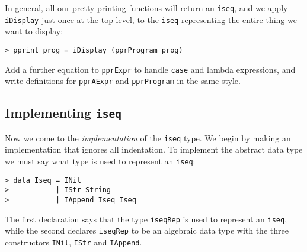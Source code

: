 In general, all our pretty-printing functions will return an
\mbox{\tt iseq}, and we apply \mbox{\tt iDisplay} just once at the top level, to the \mbox{\tt iseq}
representing the entire thing we want to display:
\begin{verbatim}
> pprint prog = iDisplay (pprProgram prog)
\end{verbatim}
%
\begin{exercise}
\label{exPpprProgram}
Add a further equation to \mbox{\tt pprExpr} to handle \mbox{\tt case} and lambda
expressions, and
write definitions for \mbox{\tt pprAExpr} and \mbox{\tt pprProgram} in the same style.
\end{exercise}

\subsection{Implementing \mbox{\tt iseq}}

Now we come to the {\em implementation\/} of the \mbox{\tt iseq} type.  We begin
by making an implementation that ignores all indentation.
To implement the abstract data type we must say what type is used to
represent an \mbox{\tt iseq}:

\begin{verbatim}
> data Iseq = INil
>           | IStr String
>           | IAppend Iseq Iseq
\end{verbatim}
%
%
%
The first declaration says that the type
\mbox{\tt iseqRep} is used to represent an \mbox{\tt iseq},
while the second declares \mbox{\tt iseqRep} to be an algebraic data type
with the three constructors \mbox{\tt INil}, \mbox{\tt IStr} and \mbox{\tt IAppend}.

